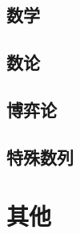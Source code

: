 \documentclass[12pt,a4paper,titlepage]{article}
\begin{document}
	\subsection{数学}

	\subsection{数论}

	\subsection{博弈论}

    \subsection{特殊数列}

\section{\LARGE 其他}

\end{document}
